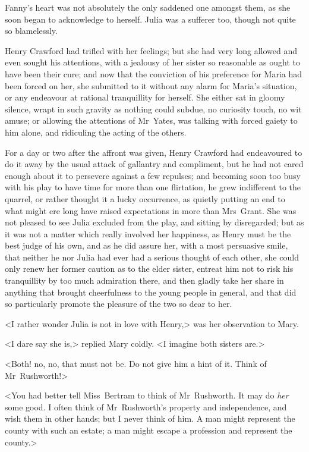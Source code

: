 Fanny's heart was not absolutely the only saddened one amongst them, as she soon began to acknowledge to herself. Julia was a sufferer too, though not quite so blamelessly.

Henry Crawford had trifled with her feelings; but she had very long allowed and even sought his attentions, with a jealousy of her sister so reasonable as ought to have been their cure; and now that the conviction of his preference for Maria had been forced on her, she submitted to it without any alarm for Maria's situation, or any endeavour at rational tranquillity for herself. She either sat in gloomy silence, wrapt in such gravity as nothing could subdue, no curiosity touch, no wit amuse; or allowing the attentions of Mr~Yates, was talking with forced gaiety to him alone, and ridiculing the acting of the others.

For a day or two after the affront was given, Henry Crawford had endeavoured to do it away by the usual attack of gallantry and compliment, but he had not cared enough about it to persevere against a few repulses; and becoming soon too busy with his play to have time for more than one flirtation, he grew indifferent to the quarrel, or rather thought it a lucky occurrence, as quietly putting an end to what might ere long have raised expectations in more than Mrs~Grant. She was not pleased to see Julia excluded from the play, and sitting by disregarded; but as it was not a matter which really involved her happiness, as Henry must be the best judge of his own, and as he did assure her, with a most persuasive smile, that neither he nor Julia had ever had a serious thought of each other, she could only renew her former caution as to the elder sister, entreat him not to risk his tranquillity by too much admiration there, and then gladly take her share in anything that brought cheerfulness to the young people in general, and that did so particularly promote the pleasure of the two so dear to her.

<I rather wonder Julia is not in love with Henry,> was her observation to Mary.

<I dare say she is,> replied Mary coldly. <I imagine both sisters are.>

<Both! no, no, that must not be. Do not give him a hint of it. Think of Mr~Rushworth!>

<You had better tell Miss~Bertram to think of Mr~Rushworth. It may do \textit{her}  some good. I often think of Mr~Rushworth's property and independence, and wish them in other hands; but I never think of him. A man might represent the county with such an estate; a man might escape a profession and represent the county.>

